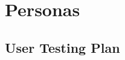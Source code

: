 \documentclass{article}
\begin{document}
\section{Personas}



\begin{appendices}

\section{User Testing Plan}\label{ap:utesting}



\end{appendices}

\pagebreak


%
%
%



\end{document}
